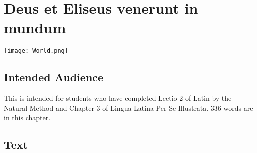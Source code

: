 \chapter{Deus et Eliseus venerunt in mundum}
\begin{center}
\texttt{[image: World.png]}
\end{center}

\section{Intended Audience}
This is intended for students who have completed Lectio 2 of Latin by the Natural Method and Chapter 3 of Lingua Latina Per Se Illustrata. 336 words are in this chapter.

\section{Text}

